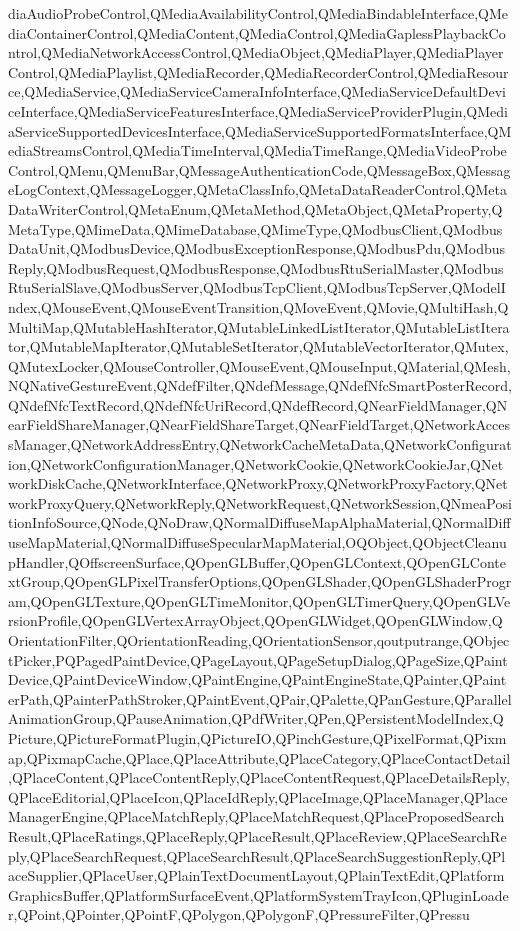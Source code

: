 {{diaAudioProbeControl,QMediaAvailabilityControl,QMediaBindableInterface,QMediaContainerControl,QMediaContent,QMediaControl,QMediaGaplessPlaybackControl,QMediaNetworkAccessControl,QMediaObject,QMediaPlayer,QMediaPlayerControl,QMediaPlaylist,QMediaRecorder,QMediaRecorderControl,QMediaResource,QMediaService,QMediaServiceCameraInfoInterface,QMediaServiceDefaultDeviceInterface,QMediaServiceFeaturesInterface,QMediaServiceProviderPlugin,QMediaServiceSupportedDevicesInterface,QMediaServiceSupportedFormatsInterface,QMediaStreamsControl,QMediaTimeInterval,QMediaTimeRange,QMediaVideoProbeControl,QMenu,QMenuBar,QMessageAuthenticationCode,QMessageBox,QMessageLogContext,QMessageLogger,QMetaClassInfo,QMetaDataReaderControl,QMetaDataWriterControl,QMetaEnum,QMetaMethod,QMetaObject,QMetaProperty,QMetaType,QMimeData,QMimeDatabase,QMimeType,QModbusClient,QModbusDataUnit,QModbusDevice,QModbusExceptionResponse,QModbusPdu,QModbusReply,QModbusRequest,QModbusResponse,QModbusRtuSerialMaster,QModbusRtuSerialSlave,QModbusServer,QModbusTcpClient,QModbusTcpServer,QModelIndex,QMouseEvent,QMouseEventTransition,QMoveEvent,QMovie,QMultiHash,QMultiMap,QMutableHashIterator,QMutableLinkedListIterator,QMutableListIterator,QMutableMapIterator,QMutableSetIterator,QMutableVectorIterator,QMutex,QMutexLocker,QMouseController,QMouseEvent,QMouseInput,QMaterial,QMesh,NQNativeGestureEvent,QNdefFilter,QNdefMessage,QNdefNfcSmartPosterRecord,QNdefNfcTextRecord,QNdefNfcUriRecord,QNdefRecord,QNearFieldManager,QNearFieldShareManager,QNearFieldShareTarget,QNearFieldTarget,QNetworkAccessManager,QNetworkAddressEntry,QNetworkCacheMetaData,QNetworkConfiguration,QNetworkConfigurationManager,QNetworkCookie,QNetworkCookieJar,QNetworkDiskCache,QNetworkInterface,QNetworkProxy,QNetworkProxyFactory,QNetworkProxyQuery,QNetworkReply,QNetworkRequest,QNetworkSession,QNmeaPositionInfoSource,QNode,QNoDraw,QNormalDiffuseMapAlphaMaterial,QNormalDiffuseMapMaterial,QNormalDiffuseSpecularMapMaterial,OQObject,QObjectCleanupHandler,QOffscreenSurface,QOpenGLBuffer,QOpenGLContext,QOpenGLContextGroup,QOpenGLPixelTransferOptions,QOpenGLShader,QOpenGLShaderProgram,QOpenGLTexture,QOpenGLTimeMonitor,QOpenGLTimerQuery,QOpenGLVersionProfile,QOpenGLVertexArrayObject,QOpenGLWidget,QOpenGLWindow,QOrientationFilter,QOrientationReading,QOrientationSensor,qoutputrange,QObjectPicker,PQPagedPaintDevice,QPageLayout,QPageSetupDialog,QPageSize,QPaintDevice,QPaintDeviceWindow,QPaintEngine,QPaintEngineState,QPainter,QPainterPath,QPainterPathStroker,QPaintEvent,QPair,QPalette,QPanGesture,QParallelAnimationGroup,QPauseAnimation,QPdfWriter,QPen,QPersistentModelIndex,QPicture,QPictureFormatPlugin,QPictureIO,QPinchGesture,QPixelFormat,QPixmap,QPixmapCache,QPlace,QPlaceAttribute,QPlaceCategory,QPlaceContactDetail,QPlaceContent,QPlaceContentReply,QPlaceContentRequest,QPlaceDetailsReply,QPlaceEditorial,QPlaceIcon,QPlaceIdReply,QPlaceImage,QPlaceManager,QPlaceManagerEngine,QPlaceMatchReply,QPlaceMatchRequest,QPlaceProposedSearchResult,QPlaceRatings,QPlaceReply,QPlaceResult,QPlaceReview,QPlaceSearchReply,QPlaceSearchRequest,QPlaceSearchResult,QPlaceSearchSuggestionReply,QPlaceSupplier,QPlaceUser,QPlainTextDocumentLayout,QPlainTextEdit,QPlatformGraphicsBuffer,QPlatformSurfaceEvent,QPlatformSystemTrayIcon,QPluginLoader,QPoint,QPointer,QPointF,QPolygon,QPolygonF,QPressureFilter,QPressu}}
